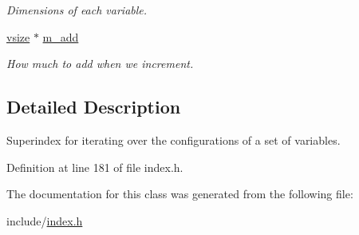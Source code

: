 \begin{DoxyCompactItemize}
\begin{DoxyCompactList}\small\item\em Dimensions of each variable. \end{DoxyCompactList}\item 
\hypertarget{classmerlin_1_1superindex_aa08c306e701cafaa61e4719737d9615d}{}\hyperlink{classmerlin_1_1superindex_a4e63d0617c6b351c664cdfd406686d62}{vsize} $\ast$ \hyperlink{classmerlin_1_1superindex_aa08c306e701cafaa61e4719737d9615d}{m\+\_\+add}\label{classmerlin_1_1superindex_aa08c306e701cafaa61e4719737d9615d}

\begin{DoxyCompactList}\small\item\em How much to add when we increment. \end{DoxyCompactList}\end{DoxyCompactItemize}


\subsection{Detailed Description}
Superindex for iterating over the configurations of a set of variables. 

Definition at line 181 of file index.\+h.



The documentation for this class was generated from the following file\+:\begin{DoxyCompactItemize}
\item 
include/\hyperlink{index_8h}{index.\+h}\end{DoxyCompactItemize}
